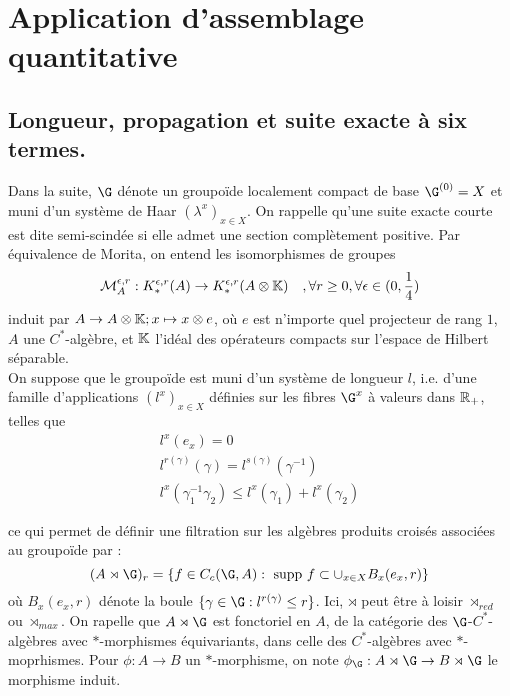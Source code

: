 \section{Application d'assemblage quantitative}

\subsection{Longueur, propagation et suite exacte à six termes.}

Dans la suite, $\G$ dénote un groupoïde localement compact de base $\G^{(0)}=X$ et muni d'un système de Haar $(\lambda^x)_{x\in X}$. On rappelle qu'une suite exacte courte est dite semi-scindée si elle admet une section complètement positive. 
Par équivalence de Morita, on entend les isomorphismes de groupes 
\[\mathcal M_A^{\epsilon , r} : K_*^{\epsilon, r }(A)\rightarrow K_*^{\epsilon,r}(A\otimes \mathbb K)\quad, \forall r\geq 0,\forall \epsilon\in (0,\frac{1}{4})\]
induit par $A\rightarrow A\otimes \mathbb K ; x\mapsto x\otimes e$, où $e$ est n'importe quel projecteur de rang $1$, $A$ une $C^*$-algèbre, et $\mathbb K$ l'idéal des opérateurs compacts sur l'espace de Hilbert séparable.\\

On suppose que le groupoïde est muni d'un système de longueur $l$, i.e. d'une famille d'applications $(l^x)_{x\in X}$ définies sur les fibres $\G^x$ à valeurs dans $\mathbb R_+$, telles que 
\[\begin{array}{l}
l^x(e_x)=0 \\
l^{r(\gamma)}(\gamma)=l^{s(\gamma)}(\gamma^{-1}) \\
l^x (\gamma_1^{-1} \gamma_2)	\leq l^x(\gamma_1)+l^x(\gamma_2) 	
\end{array}\]

ce qui permet de définir une filtration sur les algèbres produits croisés associées au groupoïde par :
\[(A\rtimes \G)_r = \{f\in C_c(\G, A) : \text{ supp }f \subset \cup_{x\in X} B_x(e_x, r)\}\]
où $B_x(e_x, r)$ dénote la boule $\{\gamma \in \G : l^{r(\gamma)}\leq r\}$. Ici, $\rtimes$ peut être à loisir $\rtimes_{red}$ ou $\rtimes_{max}$. On rapelle que $A\rtimes \G$ est fonctoriel en $A$, de la catégorie des $\G$-$C^*$-algèbres avec $*$-morphismes équivariants, dans celle des $C^*$-algèbres avec $*$-moprhismes. Pour $\phi : A\rightarrow B$ un $*$-morphisme, on note $\phi_\G : A\rtimes \G \rightarrow B\rtimes \G$ le morphisme induit. 

